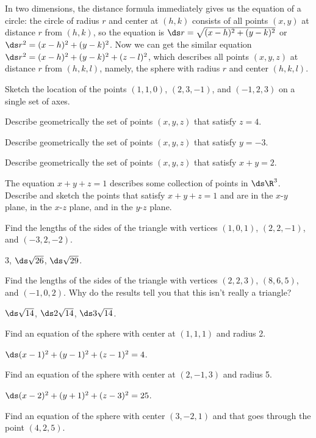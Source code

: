 In two dimensions, the distance formula immediately gives us the
equation of a circle: the circle of radius $r$ and center at $(h,k)$
consists of all points $(x,y)$ at distance $r$ from $(h,k)$, so the
equation is $\ds r=\sqrt{(x-h)^2+(y-k)^2}$ or $\ds r^2=(x-h)^2+(y-k)^2$. Now
we can get the similar equation $\ds r^2=(x-h)^2+(y-k)^2+(z-l)^2$, which
describes all points $(x,y,z)$ at distance $r$ from $(h,k,l)$, namely,
the sphere with radius $r$ and center $(h,k,l)$.

\begin{exercises}

\exercise Sketch the location of the points $(1,1,0)$, $(2,3,-1)$,
and $(-1,2,3)$ on a single set of axes.

\exercise Describe geometrically the set of points $(x,y,z)$ that
satisfy $z=4$.

\exercise Describe geometrically the set of points $(x,y,z)$ that
satisfy $y=-3$.

\exercise Describe geometrically the set of points $(x,y,z)$ that
satisfy $x+y=2$.

\exercise The equation $x+y+z=1$ describes some collection of points
in $\ds \R^3$. Describe and sketch the points that satisfy $x+y+z=1$ and
are in the $x$-$y$ plane, in the $x$-$z$ plane, and in the 
$y$-$z$ plane.

\exercise Find the lengths of the sides of the triangle with 
vertices $(1,0,1)$, $(2,2,-1)$, and $(-3,2,-2)$.
\begin{answer} $3$, $\ds \sqrt{26}$, $\ds \sqrt{29}$.
\end{answer}

\exercise Find the lengths of the sides of the triangle with 
vertices $(2,2,3)$, $(8,6,5)$, and $(-1,0,2)$. Why do the results tell
you that this isn't really a triangle?
\begin{answer} $\ds \sqrt{14}$, $\ds 2\sqrt{14}$, $\ds 3\sqrt{14}$.
\end{answer}

\exercise Find an equation of the sphere with center at $(1,1,1)$ and
radius 2.
\begin{answer} $\ds (x-1)^2+(y-1)^2+(z-1)^2=4$.
\end{answer}

\exercise Find an equation of the sphere with center at $(2,-1,3)$ and
radius 5.
\begin{answer} $\ds (x-2)^2+(y+1)^2+(z-3)^2=25$.
\end{answer}

\exercise Find an equation of the sphere with center $(3, -2, 1)$ and
that goes through the point $(4, 2, 5)$.


\end{exercises}
